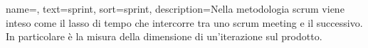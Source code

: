 {
    name=,
    text=sprint,
    sort=sprint,
    description={Nella metodologia scrum viene inteso come il lasso di tempo che intercorre tra uno scrum meeting e il successivo. In particolare è la misura della dimensione di un'iterazione sul prodotto.}
}
